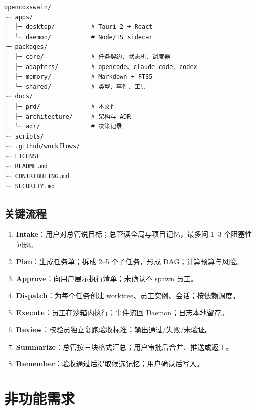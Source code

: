\documentclass[UTF8,11pt,a4paper,fontset=windows]{ctexart}
\let\ocsection\section
\renewcommand{\section}{\Needspace{8\baselineskip}\ocsection}
\let\ocsubsection\subsection
\renewcommand{\subsection}{\Needspace{5\baselineskip}\ocsubsection}
\begin{document}
\begin{lstlisting}[caption={OpenCoxswain 仓库结构建议},label={lst:repo}]
opencoxswain/
├─ apps/
│  ├─ desktop/          # Tauri 2 + React
│  └─ daemon/           # Node/TS sidecar
├─ packages/
│  ├─ core/             # 任务契约、状态机、调度器
│  ├─ adapters/         # opencode、claude-code、codex
│  ├─ memory/           # Markdown + FTS5
│  └─ shared/           # 类型、事件、工具
├─ docs/
│  ├─ prd/              # 本文件
│  ├─ architecture/     # 架构与 ADR
│  └─ adr/              # 决策记录
├─ scripts/
├─ .github/workflows/
├─ LICENSE
├─ README.md
├─ CONTRIBUTING.md
└─ SECURITY.md
\end{lstlisting}

\subsection{关键流程}

\begin{enumerate}
  \item \textbf{Intake}：用户对总管说目标；总管读全局与项目记忆，最多问 1--3 个阻塞性问题。
  \item \textbf{Plan}：生成任务单；拆成 2--5 个子任务，形成 DAG；计算预算与风险。
  \item \textbf{Approve}：向用户展示执行清单；未确认不 spawn 员工。
  \item \textbf{Dispatch}：为每个任务创建 worktree、员工实例、会话；按依赖调度。
  \item \textbf{Execute}：员工在沙箱内执行；事件流回 Daemon；日志本地留存。
  \item \textbf{Review}：校验员独立复跑验收标准；输出通过/失败/未验证。
  \item \textbf{Summarize}：总管按三块格式汇总；用户审批后合并、推送或返工。
  \item \textbf{Remember}：验收通过后提取候选记忆；用户确认后写入。
\end{enumerate}

\needspace{9cm}
\section{非功能需求}
\end{document}
